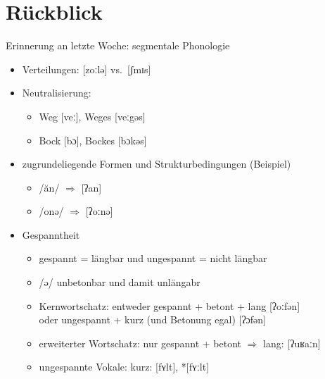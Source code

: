 
\section{Rückblick}

\begin{frame}
  {Erinnerung an letzte Woche: segmentale Phonologie}
  \pause
  \begin{itemize}[<+->]
    \item Verteilungen: [\alert{z}oːlə] vs.\ [ʃmɪ\alert{s}]
    \item Neutralisierung:
      \begin{itemize}[<+->]
        \item  Weg [veː], Weges [veː\alert{g}əs]
        \item Bock [bɔ], Bockes [bɔ\alert{k}əs]
      \end{itemize}
    \item zugrundeliegende Formen und Strukturbedingungen (Beispiel)
      \begin{itemize}[<+->]
        \item /ăn/ $\Rightarrow$ [ʔan]
        \item /onə/ $\Rightarrow$ [ʔoːnə] 
      \end{itemize}
    \item Gespanntheit
      \begin{itemize}[<+->]
        \item \alert{gespannt = längbar} und \alert{ungespannt = nicht längbar}
        \item \alert{/ə/ unbetonbar und damit unlängabr}
        \item Kernwortschatz: entweder \alert{gespannt + betont + lang} [ʔoːfən]\\
          oder \alert{ungespannt + kurz} (und Betonung egal) [ʔɔfən]
        \item erweiterter Wortschatz: \alert{nur} \alert{gespannt + betont $\Rightarrow$ lang}: [ʔuʁaːn]
        \item ungespannte Vokale:  kurz: [fʏlt], *[fʏːlt]
      \end{itemize}
  \end{itemize}
\end{frame}


